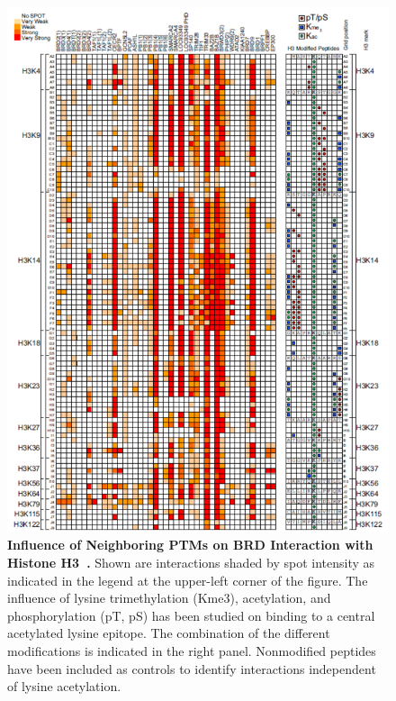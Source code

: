 \documentclass[arial,11pt]{article}
\begin{document}
\begin{figure}[ht!]
\centering
    \includegraphics[width=.8\textwidth]{figures/BRDH3.pdf}
  \caption{\footnotesize {\bf Influence of Neighboring PTMs on BRD Interaction with Histone H3~\cite{filippakopoulos12}.} Shown are interactions shaded by spot intensity as indicated in the legend at the upper-left corner of the figure. The influence of lysine trimethylation (Kme3), acetylation, and phosphorylation (pT, pS) has been studied on binding to a central acetylated lysine epitope. The combination of the different modifications is indicated in the right panel. Nonmodified peptides have been included as controls to identify interactions independent of lysine acetylation. }
  \label{fig.dbp.gingras.ptms}
\end{figure}
\end{document}
